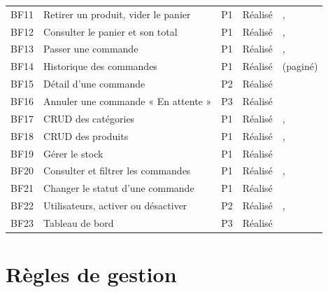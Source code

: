 {\begin{xltabular}{\linewidth}{P{1.1cm}P{3.6cm}ccL}
  BF11 & Retirer un produit, vider le panier & P1 & Réalisé & ,  \\
  BF12 & Consulter le panier et son total & P1 & Réalisé & ,  \\
  BF13 & Passer une commande & P1 & Réalisé & ,  \\
  BF14 & Historique des commandes & P1 & Réalisé &  (paginé) \\
  BF15 & Détail d'une commande & P2 & Réalisé &  \\
  BF16 & Annuler une commande « En attente » & P3 & Réalisé &  \\
  BF17 & CRUD des catégories & P1 & Réalisé & ,  \\
  BF18 & CRUD des produits & P1 & Réalisé & ,  \\
  BF19 & Gérer le stock & P1 & Réalisé &  \\
  BF20 & Consulter et filtrer les commandes & P1 & Réalisé & ,  \\
  BF21 & Changer le statut d'une commande & P1 & Réalisé &  \\
  BF22 & Utilisateurs, activer ou désactiver & P2 & Réalisé & ,  \\
  BF23 & Tableau de bord & P3 & Réalisé &  \\
\end{xltabular}
}

\section{Règles de gestion}

